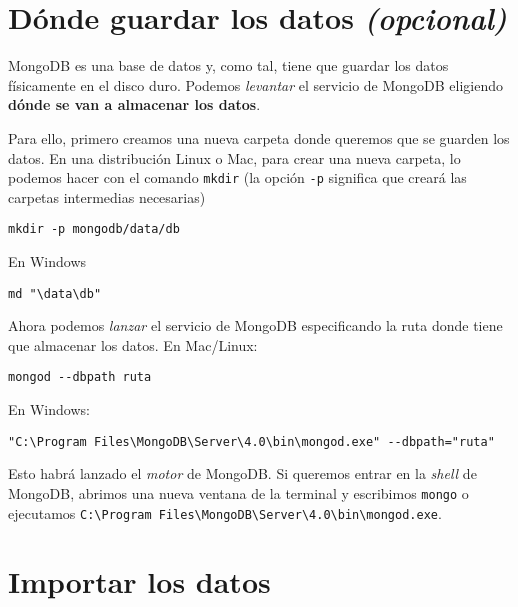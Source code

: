 \documentclass[]{article}
\begin{document}
\hypertarget{donde-guardar-los-datos-opcional}{%
\section{\texorpdfstring{Dónde guardar los datos
\emph{(opcional)}}{Dónde guardar los datos (opcional)}}\label{donde-guardar-los-datos-opcional}}

MongoDB es una base de datos y, como tal, tiene que guardar los datos
físicamente en el disco duro. Podemos \emph{levantar} el servicio de
MongoDB eligiendo \textbf{dónde se van a almacenar los datos}.

Para ello, primero creamos una nueva carpeta donde queremos que se
guarden los datos. En una distribución Linux o Mac, para crear una nueva
carpeta, lo podemos hacer con el comando \texttt{mkdir} (la opción
\texttt{-p} significa que creará las carpetas intermedias necesarias)

\begin{verbatim}
mkdir -p mongodb/data/db
\end{verbatim}

En Windows

\begin{verbatim}
md "\data\db"
\end{verbatim}

Ahora podemos \emph{lanzar} el servicio de MongoDB especificando la ruta
donde tiene que almacenar los datos. En Mac/Linux:

\begin{verbatim}
mongod --dbpath ruta
\end{verbatim}

En Windows:

\begin{verbatim}
"C:\Program Files\MongoDB\Server\4.0\bin\mongod.exe" --dbpath="ruta"
\end{verbatim}

Esto habrá lanzado el \emph{motor} de MongoDB. Si queremos entrar en la
\emph{shell} de MongoDB, abrimos una nueva ventana de la terminal y
escribimos \texttt{mongo} o ejecutamos
\texttt{C:\textbackslash{}Program\ Files\textbackslash{}MongoDB\textbackslash{}Server\textbackslash{}4.0\textbackslash{}bin\textbackslash{}mongod.exe}.

\hypertarget{importar-los-datos}{%
\section{Importar los datos}\label{importar-los-datos}}
\end{document}
